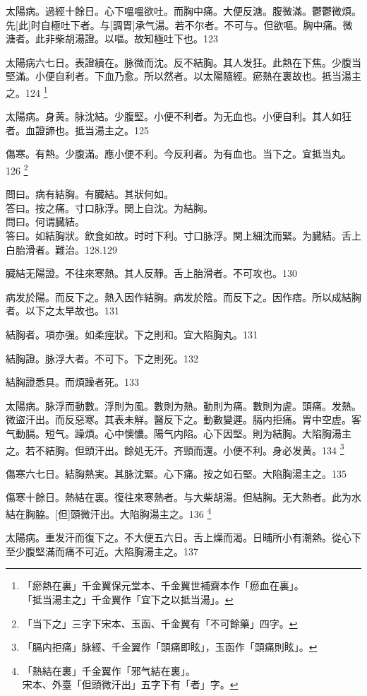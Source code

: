 \documentclass[12pt,twoside,UTF8,b5paper]{ctexbook}
\begin{document}
太陽病。過經十餘日。心下嗢嗢欲吐。而胸中痛。大便反溏。腹微滿。鬱鬱微煩。先[此]时自極吐下者。与[調胃]承气湯。若不尔者。不可与。但欲嘔。胸中痛。微溏者。此非柴胡湯證。以嘔。故知極吐下也。123

太陽病六七日。表證續在。脉微而沈。反不結胸。其人发狂。此熱在下焦。少腹当堅滿。小便自利者。下血乃愈。所以然者。以太陽隨經。瘀熱在裏故也。抵当湯主之。124
	\footnote{「瘀熱在裏」千金翼保元堂本、千金翼世補齋本作「瘀血在裏」。\\「抵当湯主之」千金翼作「宜下之以抵当湯」。}

太陽病。身黄。脉沈結。少腹堅。小便不利者。为无血也。小便自利。其人如狂者。血證諦也。抵当湯主之。125

傷寒。有熱。少腹滿。應小便不利。今反利者。为有血也。当下之。宜抵当丸。126
	\footnote{「当下之」三字下宋本、玉函、千金翼有「不可餘藥」四字。}

問曰。病有結胸。有臓結。其狀何如。\\
答曰。按之痛。寸口脉浮。関上自沈。为結胸。\\
問曰。何谓臓結。\\
答曰。如結胸狀。飲食如故。时时下利。寸口脉浮。関上細沈而緊。为臓結。舌上白胎滑者。難治。128.129

臓結无陽證。不往來寒熱。其人反靜。舌上胎滑者。不可攻也。130

病发於陽。而反下之。熱入因作結胸。病发於陰。而反下之。因作痞。所以成結胸者。以下之太早故也。131

結胸者。項亦强。如柔痙狀。下之則和。宜大陷胸丸。131

結胸證。脉浮大者。不可下。下之則死。132

結胸證悉具。而煩躁者死。133

太陽病。脉浮而動數。浮則为風。數則为熱。動則为痛。數則为虗。頭痛。发熱。微盜汗出。而反惡寒。其表未觧。醫反下之。動數變遲。膈内拒痛。胃中空虗。客气動膈。短气。躁煩。心中懊憹。陽气内陷。心下因堅。則为結胸。大陷胸湯主之。若不結胸。但頭汗出。餘処无汗。齐頸而還。小便不利。身必发黄。134
	\footnote{「膈内拒痛」脉經、千金翼作「頭痛即眩」，玉函作「頭痛則眩」。}

傷寒六七日。結胸熱実。其脉沈緊。心下痛。按之如石堅。大陷胸湯主之。135

傷寒十餘日。熱結在裏。復往來寒熱者。与大柴胡湯。但結胸。无大熱者。此为水結在胸脇。[但]頭微汗出。大陷胸湯主之。136
	\footnote{「熱結在裏」千金翼作「邪气結在裏」。\\宋本、外臺「但頭微汗出」五字下有「者」字。}

太陽病。重发汗而復下之。不大便五六日。舌上燥而渴。日晡所小有潮熱。從心下至少腹堅滿而痛不可近。大陷胸湯主之。137
\end{document}
